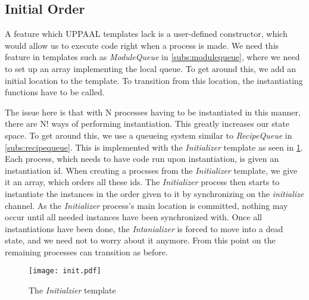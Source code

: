 

\subsection{Initial Order}
A feature which UPPAAL templates lack is a user-defined constructor, which would allow us to execute code right when a process is made. We need this feature in templates such as \emph{ModuleQueue} in \cref{subs:modulequeue}, where we need to set up an array implementing the local queue. To get around this, we add an initial location to the template. To transition from this location, the instantiating functions have to be called.

The issue here is that with N processes having to be instantiated in this manner, there are N! ways of performing instantiation. This greatly increases our state space. To get around this, we use a queueing system similar to \emph{RecipeQueue} in \cref{subs:recipequeue}. This is implemented with the \emph{Initializer} template as seen in \cref{fig:initializer}. Each process, which needs to have code run upon instantiation, is given an instantiation id. When creating a procsses from the \emph{Initializer} template, we give it an array, which orders all these ids. The \emph{Initializer} process then starts to instantiate the instances in the order given to it by synchronizing on the \emph{initialize} channel. As the \emph{Initializer} process's main location is committed, nothing may occur until all needed instances have been synchronized with. Once all instantiations have been done, the \emph{Intanializer} is forced to move into a dead state, and we need not to worry about it anymore. From this point on the remaining  processes can transition as before. 

\begin{figure}[h]
\centering
\texttt{[image: init.pdf]}
\caption{The \textit{Initialzier} template}
\label{fig:initializer}
\end{figure}

